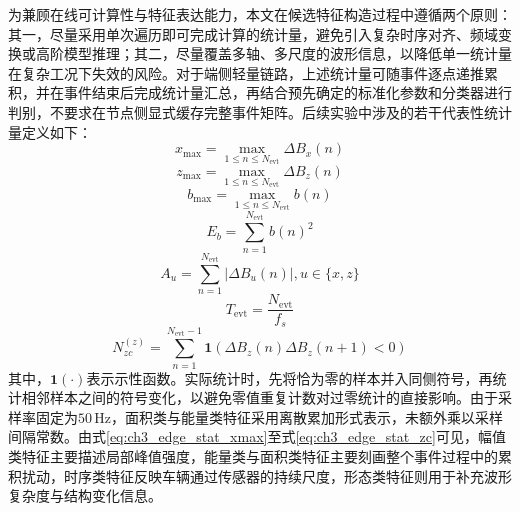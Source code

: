 \documentclass{xdupgthesis}
\begin{document}
为兼顾在线可计算性与特征表达能力，本文在候选特征构造过程中遵循两个原则：其一，尽量采用单次遍历即可完成计算的统计量，避免引入复杂时序对齐、频域变换或高阶模型推理；其二，尽量覆盖多轴、多尺度的波形信息，以降低单一统计量在复杂工况下失效的风险。对于端侧轻量链路，上述统计量可随事件逐点递推累积，并在事件结束后完成统计量汇总，再结合预先确定的标准化参数和分类器进行判别，不要求在节点侧显式缓存完整事件矩阵。后续实验中涉及的若干代表性统计量定义如下：
\begin{equation}
\label{eq:ch3_edge_stat_xmax}
    x_{\max}=\max_{1\le n\le N_{\mathrm{evt}}}\Delta B_x(n)
\end{equation}
\begin{equation}
\label{eq:ch3_edge_stat_zmax}
    z_{\max}=\max_{1\le n\le N_{\mathrm{evt}}}\Delta B_z(n)
\end{equation}
\begin{equation}
    b_{\max}=\max_{1\le n\le N_{\mathrm{evt}}} b(n)
\end{equation}
\begin{equation}
\label{eq:ch3_edge_stat_eb}
    E_b=\sum_{n=1}^{N_{\mathrm{evt}}} b(n)^2
\end{equation}
\begin{equation}
\label{eq:ch3_edge_stat_au}
    A_u=\sum_{n=1}^{N_{\mathrm{evt}}}\left|\Delta B_u(n)\right|, u\in\{x,z\}
\end{equation}
\begin{equation}
    T_{\mathrm{evt}}=\frac{N_{\mathrm{evt}}}{f_s}
\end{equation}
\begin{equation}
\label{eq:ch3_edge_stat_zc}
    N_{zc}^{(z)}=
    \sum_{n=1}^{N_{\mathrm{evt}}-1}
    \mathbf{1}\!\left(\Delta B_z(n)\Delta B_z(n+1)<0\right)
\end{equation}
其中，$\mathbf{1}(\cdot)$表示示性函数。实际统计时，先将恰为零的样本并入同侧符号，再统计相邻样本之间的符号变化，以避免零值重复计数对过零统计的直接影响。由于采样率固定为$50\,\mathrm{Hz}$，面积类与能量类特征采用离散累加形式表示，未额外乘以采样间隔常数。由式\eqref{eq:ch3_edge_stat_xmax}至式\eqref{eq:ch3_edge_stat_zc}可见，幅值类特征主要描述局部峰值强度，能量类与面积类特征主要刻画整个事件过程中的累积扰动，时序类特征反映车辆通过传感器的持续尺度，形态类特征则用于补充波形复杂度与结构变化信息。
\end{document}
